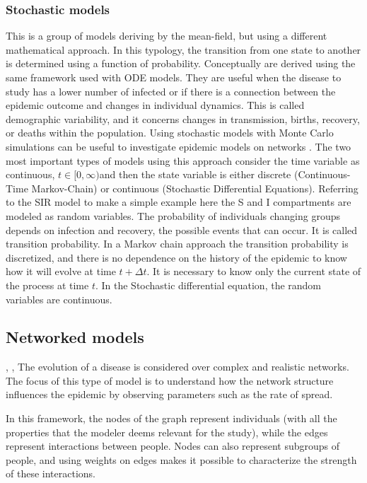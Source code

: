 \subsubsection{Stochastic models} 	
This is a group of models deriving by the mean-field, but using a different mathematical approach.
In this typology, the transition from one state to another is determined using a function of probability.  Conceptually are derived using the same framework used with ODE models. They are useful when the disease to study has a lower number of infected or if there is a connection between the epidemic outcome and changes in individual dynamics. This is called demographic variability, and it concerns changes in transmission, births, recovery, or deaths within the population. Using stochastic models with Monte Carlo simulations can be useful to investigate epidemic models on networks \cite{Allen2017}. 
The two most important types of models using this approach consider the time variable as continuous, $t \in [0, \infty) $and then the state variable is either discrete (Continuous-Time Markov-Chain) or continuous (Stochastic Differential Equations).
Referring to the SIR model to make a simple example here the S and I compartments are modeled as random variables. The probability of individuals changing groups depends on infection and recovery, the possible events that can occur. It is called transition probability. 
In a Markov chain approach the transition probability is discretized, and there is no dependence on the history of the epidemic to know how it will evolve at time $t + \Delta t$. It is necessary to know only the current state of the process at time $t$. 
In the Stochastic differential equation, the random variables are continuous. 

\subsection{Networked models}
\cite{Newman2002}, \cite{VanMieghem2009}, 
The evolution of a disease is considered over complex and realistic networks. The focus of this type of model is to understand how the network structure influences the epidemic by observing parameters such as the rate of spread.

In this framework, the nodes of the graph represent individuals (with all the properties that the modeler deems relevant for the study), while the edges represent interactions between people. Nodes can also represent subgroups of people, and using weights on edges makes it possible to characterize the strength of these interactions.

